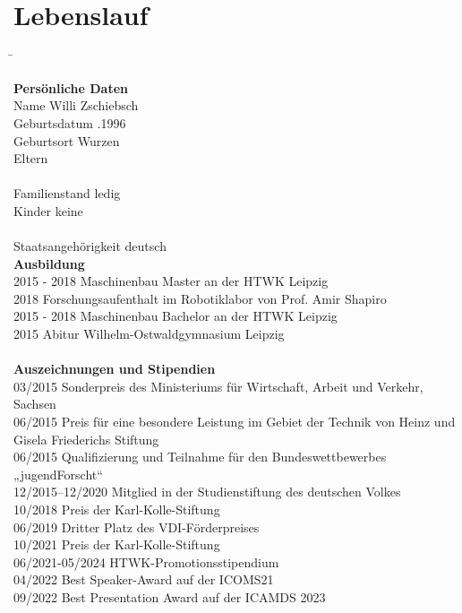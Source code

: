 \pagestyle{empty}
\section*{Lebenslauf}

\begin{tabbing}
\hspace*{4cm}\= \kill

\textbf{Persönliche Daten}\\[0.45em]%
Name							\>  Willi Zschiebsch	\\[0.45em]
Geburtsdatum					.1996			\\[0.45em]
Geburtsort						\> 	Wurzen  			\\[0.45em]
Eltern							\> 						\\
								\> 						\\[0.45em]
Familienstand					\> 	ledig				\\[0.45em]
Kinder      					\> 	keine				\\[0.45em]
            					\> 						\\[0.45em]

Staatsangehörigkeit		\> 		deutsch					\\[1.5em]

\textbf{Ausbildung} \\[0.45em]
2015 - 2018	\> Maschinenbau Master an der HTWK Leipzig	\\[0.5em]	
2018	\> Forschungsaufenthalt im Robotiklabor von Prof. Amir Shapiro 	\\[0.5em]
2015 - 2018	\> Maschinenbau Bachelor an der HTWK Leipzig	\\[0.5em]
2015	\> Abitur Wilhelm-Ostwaldgymnasium Leipzig	\\[0.5em]
															\\[1.5em]

\textbf{Auszeichnungen und Stipendien} \\[0.45em]
03/2015 \> Sonderpreis des Ministeriums für Wirtschaft, Arbeit und Verkehr, Sachsen \\[0.5em]
06/2015 \>  Preis für eine besondere Leistung im Gebiet der Technik von Heinz und \\ 
		\> Gisela Friederichs Stiftung \\[0.5em]
06/2015 \>  Qualifizierung und Teilnahme für den Bundeswettbewerbes „jugendForscht“ \\[0.5em]
12/2015–12/2020 \>  Mitglied in der Studienstiftung des deutschen Volkes \\[0.5em]
10/2018 \> Preis der Karl-Kolle-Stiftung \\[0.5em]
06/2019 \> Dritter Platz des VDI-Förderpreises \\[0.5em]
10/2021 \> Preis der Karl-Kolle-Stiftung \\[0.5em]
06/2021-05/2024 \>  HTWK-Promotionsstipendium \\[0.5em]
04/2022 \> Best Speaker-Award auf der ICOMS21 \\[0.5em]
09/2022 \> Best Presentation Award auf der ICAMDS 2023 \\[0.5em]

\end{tabbing}





